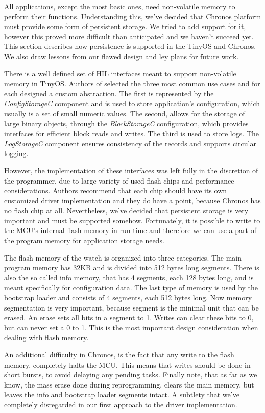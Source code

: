 All applications, except the most basic ones, need non-volatile memory to perform their functions. Understanding this, we've decided that Chronos platform must provide some form of persistent storage. We tried to add support for it, however this proved more difficult than anticipated and we haven't succeed yet. This section describes how persistence is supported in the TinyOS and Chronos. We also draw lessons from our flawed design and ley plans for future work.

There is a well defined set of HIL interfaces meant to support non-volatile memory in TinyOS. Authors of \cite{TEP103} selected the three most common use cases and for each designed a custom abstraction. The first is represented by the \emph{ConfigStorageC} component and is used to store application's configuration, which usually is a set of small numeric values. The second, allows for the storage of large binary objects, through the \emph{BlockStorageC} configuration, which provides interfaces for efficient block reads and writes. The third is used to store logs. The \emph{LogStorageC} component ensures consistency of the records and supports circular logging.

However, the implementation of these interfaces was left fully in the discretion of the programmer, due to large variety of used flash chips and performance considerations. Authors recommend that each chip should have its own customized driver implementation and they do have a point, because Chronos has no flash chip at all. Nevertheless, we've decided that persistent storage is very important and must be supported somehow. Fortunately, it is possible to write to the MCU's internal flash memory in run time and therefore we can use a part of the program memory for application storage needs.

The flash memory of the watch is organized into three categories. The main program memory has 32KB and is divided into 512 bytes long segments. There is also the so called info memory, that has 4 segments, each 128 bytes long, and is meant specifically for configuration data. The last type of memory is used by the bootstrap loader and consists of 4 segments, each 512 bytes long. Now memory segmentation is very important, because segment is the minimal unit that can be erased. An erase sets all bits in a segment to 1. Writes can clear these bits to 0, but can never set a 0 to 1. This is the most important design consideration when dealing with flash memory.

An additional difficulty in Chronos, is the fact that any write to the flash memory, completely halts the MCU. This means that writes should be done in short bursts, to avoid delaying any pending tasks. Finally note, that as far as we know, the mass erase done during reprogramming, clears the main memory, but leaves the info and bootstrap loader segments intact. A subtlety that we've completely disregarded in our first approach to the driver implementation.

